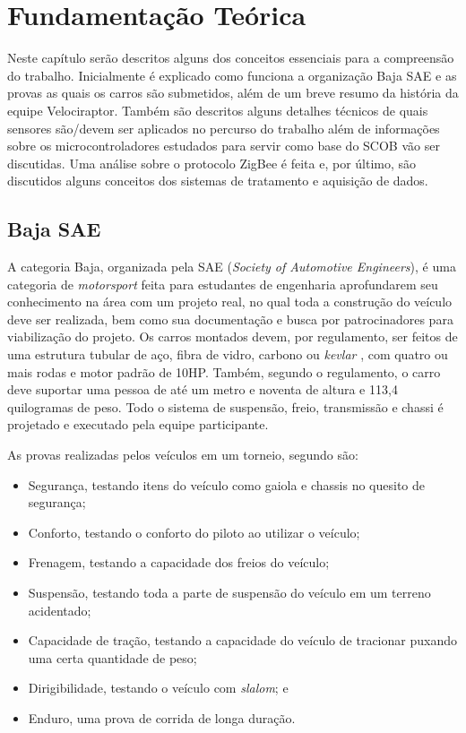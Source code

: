 \chapter{Fundamentação Teórica}
	\label{ch:fundamentacao}
Neste capítulo serão descritos alguns dos conceitos essenciais para a compreensão do trabalho. Inicialmente é explicado como funciona a organização Baja SAE e as provas as quais os carros são submetidos, além de um breve resumo da história da equipe Velociraptor. Também são descritos alguns detalhes técnicos de quais sensores são/devem ser aplicados no percurso do trabalho além de informações sobre os microcontroladores estudados para servir como base do SCOB vão ser discutidas. Uma análise sobre o protocolo ZigBee é feita e, por último, são discutidos alguns conceitos dos sistemas de tratamento e aquisição de dados.

\section{Baja SAE}
A categoria Baja, organizada pela SAE (\textit{Society of Automotive Engineers}), é uma categoria de \textit{motorsport} feita para estudantes de engenharia aprofundarem seu conhecimento na área com um projeto real, no qual toda a construção do veículo deve ser realizada, bem como sua documentação e busca por patrocinadores para viabilização do projeto. Os carros montados devem, por regulamento, \cite{regulamentobajasae} ser feitos de uma estrutura tubular de aço, fibra de vidro, carbono ou \textit{kevlar} \cite{projetoMiniBaja2006}, com quatro ou mais rodas e motor padrão de 10HP. Também, segundo o regulamento, o carro deve suportar uma pessoa de até um metro e noventa de altura e 113,4 quilogramas de peso. Todo o sistema de suspensão, freio, transmissão e chassi é projetado e executado pela equipe participante.  

As provas realizadas pelos veículos em um torneio, segundo \cite{bajasae} são:
\begin{itemize}
	\item Segurança, testando itens do veículo como gaiola e chassis no quesito de segurança;
	\item Conforto, testando o conforto do piloto ao utilizar o veículo;
	\item Frenagem, testando a capacidade dos freios do veículo;
	\item Suspensão, testando toda a parte de suspensão do veículo em um terreno acidentado;
	\item Capacidade de tração, testando a capacidade do veículo de tracionar puxando uma certa quantidade de peso;
	\item Dirigibilidade, testando o veículo com \textit{slalom}; e
	\item Enduro, uma prova de corrida de longa duração.
\end{itemize}

